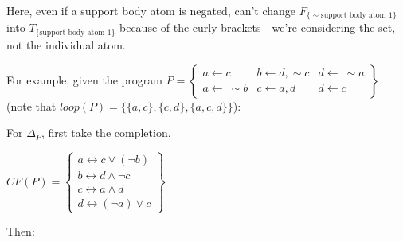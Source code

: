 \documentclass[9pt,a4paper,landscape]{article}
\newcommand{\ngtb}[1]{T_{ \{#1\} }}
\newcommand{\ngfb}[1]{F_{ \{#1\} }}
\begin{document}
{Here, even if a support body atom is negated, can't change $\ngfb{\sim \text{support body atom 1}}$ into $\ngtb{\text{support body atom 1}}$ because of the curly brackets---we're considering the set, not the individual atom.

\vspace{\baselineskip}

For example, given the program $P = \left\{\begin{array}{lll}
a \leftarrow c & b \leftarrow d, \sim c & d \leftarrow\ \sim a\\
a \leftarrow\ \sim b & c \leftarrow a, d & d \leftarrow c
\end{array}\right\}$ (note that $loop(P) = \{ \{a, c\}, \{c, d\}, \{a, c, d\} \}$):

For $\Delta_P$, first take the completion.

\begin{center}
	$CF(P) = \left\{\begin{array}{l}
a \leftrightarrow c \lor (\neg b) \\
b \leftrightarrow d \land \neg c \\
c \leftrightarrow a \land d \\
d \leftrightarrow (\neg a) \lor c
\end{array}\right\}$
\end{center}

\pagebreak

Then:

}
\end{document}
